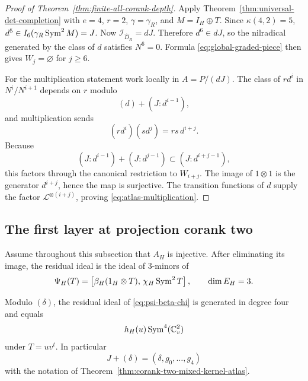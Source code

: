 \begin{proof}[Proof of Theorem~\ref{thm:finite-all-corank-depth}]
Apply Theorem~\ref{thm:universal-det-completion} with
\(e=4\), \(r=2\), \(\gamma=\gamma_R\), and
\(M=I_H\oplus T\).  Since \(\kappa(4,2)=5\),
\(d^5\in I_6(\gamma_R\operatorname{Sym}^2M)=J\).
Now \(\mathcal I_{\widehat D_R}=dJ\).  Therefore
\(d^6\in dJ\), so the nilradical generated by the class of \(d\)
satisfies \(N^6=0\).  Formula
\eqref{eq:global-graded-piece} then gives \(W_j=\varnothing\) for
\(j\ge6\).

For the multiplication statement work locally in
\(A=P/(dJ)\).  The class of \(rd^i\) in
\(N^i/N^{i+1}\) depends on \(r\) modulo
\[
 (d)+(J:d^{i-1}),
\]
and multiplication sends
\[
 (rd^i)(sd^j)=rs\,d^{i+j}.
\]
Because
\[
 (J:d^{i-1})+(J:d^{j-1})
 \subset (J:d^{i+j-1}),
\]
this factors through the canonical restriction to \(W_{i+j}\).
The image of \(1\otimes1\) is the generator \(d^{i+j}\), hence the
map is surjective.  The transition functions of \(d\) supply the
factor \(\mathcal L^{\otimes(i+j)}\), proving
\eqref{eq:atlas-multiplication}.
\end{proof}

\subsection{The first layer at projection corank two}

Assume throughout this subsection that \(A_H\) is injective.  After
eliminating its image, the residual ideal is the ideal of \(3\)-minors
of
\begin{equation}\label{eq:psi-beta-chi}
 \Psi_H(T)=
 \left[
   \beta_H(1_H\otimes T),\,
   \chi_H\operatorname{Sym}^2T
 \right],
 \qquad \dim E_H=3.
\end{equation}

\begin{lemma}
\label{lem:contact-symbol-all-Ainj}
Modulo \((\delta)\), the residual ideal of
\eqref{eq:psi-beta-chi} is generated in degree four and equals
\[
 h_H(u)\operatorname{Sym}^4(\mathbb C^2_v)
\]
under \(T=uv^t\).  In particular
\[
 J+(\delta)=(\delta,g_0,\ldots,g_4)
\]
with the notation of
Theorem~\ref{thm:corank-two-mixed-kernel-atlas}.
\end{lemma}

